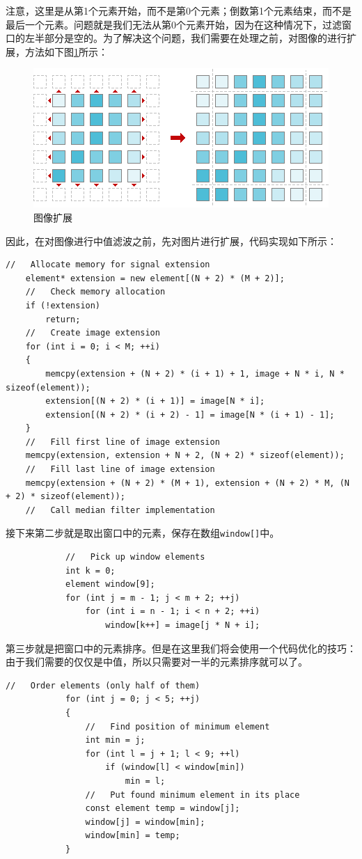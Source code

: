 \documentclass[a4paper]{ctexrep}
\begin{document}
注意，这里是从第1个元素开始，而不是第0个元素；倒数第1个元素结束，而不是最后一个元素。问题就是我们无法从第0个元素开始，因为在这种情况下，过滤窗口的左半部分是空的。为了解决这个问题，我们需要在处理之前，对图像的进行扩展，方法如下图\ref {fig:imgExt}所示：
\begin{figure}
\centering
\includegraphics{img/extendImg.png}
\caption{图像扩展}
\label{fig:imgExt}
\end{figure}
因此，在对图像进行中值滤波之前，先对图片进行扩展，代码实现如下所示：
\begin{lstlisting}
//   Allocate memory for signal extension
	element* extension = new element[(N + 2) * (M + 2)];
	//   Check memory allocation
	if (!extension)
		return;
	//   Create image extension
	for (int i = 0; i < M; ++i)
	{
		memcpy(extension + (N + 2) * (i + 1) + 1, image + N * i, N * sizeof(element));
		extension[(N + 2) * (i + 1)] = image[N * i];
		extension[(N + 2) * (i + 2) - 1] = image[N * (i + 1) - 1];
	}
	//   Fill first line of image extension
	memcpy(extension, extension + N + 2, (N + 2) * sizeof(element));
	//   Fill last line of image extension
	memcpy(extension + (N + 2) * (M + 1), extension + (N + 2) * M, (N + 2) * sizeof(element));
	//   Call median filter implementation
\end{lstlisting}
接下来第二步就是取出窗口中的元素，保存在数组\lstinline{window[]}中。
\begin{lstlisting}
			//   Pick up window elements
			int k = 0;
			element window[9];
			for (int j = m - 1; j < m + 2; ++j)
				for (int i = n - 1; i < n + 2; ++i)
					window[k++] = image[j * N + i];
\end{lstlisting}

第三步就是把窗口中的元素排序。但是在这里我们将会使用一个代码优化的技巧：由于我们需要的仅仅是中值，所以只需要对一半的元素排序就可以了。

\begin{lstlisting}
//   Order elements (only half of them)
			for (int j = 0; j < 5; ++j)
			{
				//   Find position of minimum element
				int min = j;
				for (int l = j + 1; l < 9; ++l)
					if (window[l] < window[min])
						min = l;
				//   Put found minimum element in its place
				const element temp = window[j];
				window[j] = window[min];
				window[min] = temp;
			}
\end{lstlisting}
\end{document}
